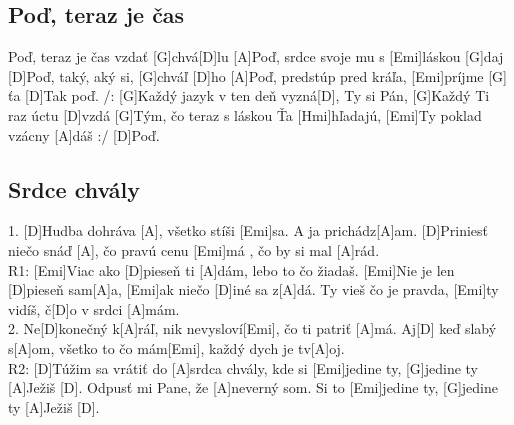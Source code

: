 \documentclass[10pt]{article}
\begin{document}
\begin{Large}
\begin{minipage}{\textwidth}
\subsection{Poď, teraz je čas}
\begin{multicols*}{2}
\begin{guitar}
	[D]Poď, teraz je čas vzdať [G]chvá[D]lu
	[A]Poď, srdce svoje mu s [Emi]láskou [G]daj
	[D]Poď, taký, aký si, [G]chváľ [D]ho
	[A]Poď, predstúp pred kráľa, [Emi]príjme [G] ťa
	[D]Tak poď.
	\columnbreak
	/: [G]Každý jazyk v ten deň vyzná[D], Ty si Pán,
	[G]Každý Ti raz úctu [D]vzdá
	[G]Tým, čo teraz s láskou Ťa [Hmi]hľadajú,
	[Emi]Ty poklad vzácny [A]dáš :/
	[D]Poď.
\end{guitar}
\end{multicols*}
\end{minipage}


\begin{minipage}{\textwidth}
\subsection{Srdce chvály}
\begin{multicols}{2}
\begin{guitar}	
	1. [D]Hudba dohráva [A], všetko stíši [Emi]sa. 
	A ja prichádz[A]am. [D]Priniesť niečo snáď [A],
	čo pravú cenu [Emi]má , čo by si mal [A]rád.
	\\
	R1: [Emi]Viac ako [D]pieseň ti [A]dám, 
	lebo to čo žiadaš. 
	[Emi]Nie je len [D]pieseň sam[A]a, 
	[Emi]ak niečo [D]iné sa z[A]dá.
	Ty vieš čo je pravda, 
	[Emi]ty vidíš, č[D]o v srdci [A]mám.
	\\
	2. Ne[D]konečný k[A]ráľ, nik nevysloví[Emi], 
	čo ti patriť [A]má. 
	Aj[D] keď slabý s[A]om, všetko to čo mám[Emi],
	každý dych je tv[A]oj.
	\\
	R2: [D]Túžim sa vrátiť do [A]srdca chvály, 
	kde si [Emi]jedine ty, [G]jedine ty [A]Ježiš [D].
	Odpusť mi Pane, že [A]neverný som. 
	Si to [Emi]jedine ty, [G]jedine ty [A]Ježiš [D].
\end{guitar}
\end{multicols}
\end{minipage}

\begin{minipage}{\textwidth}

\end{minipage}
\end{Large}
\end{document}
